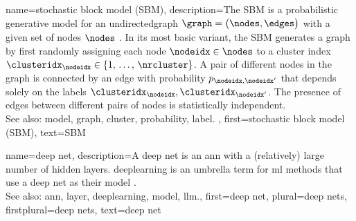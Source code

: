 {name={stochastic block model (SBM)},
	description={The SBM \cite{holland1983stochastic} is a 
		probabilistic generative \gls{model} for an \gls{undirectedgraph} $\graph = \big( \nodes, \edges \big)$ 
		with a given set of nodes $\nodes$ \cite{AbbeSBM2018}. In its most basic variant, 
		the SBM generates a \gls{graph} by first randomly assigning each node $\nodeidx \in \nodes$ to 
		a \gls{cluster} index $\clusteridx_{\nodeidx} \in \{1, \,\ldots, \,\nrcluster\}$. A pair of different nodes in the 
		\gls{graph} is \gls{connected} by an edge with \gls{probability} $p_{\nodeidx,\nodeidx'}$ that depends 
		solely on the \glspl{label} $\clusteridx_{\nodeidx}, \clusteridx_{\nodeidx'}$. 
		The presence of edges between different pairs of 
		nodes is statistically independent.
					\\ 
		See also: \gls{model}, \gls{graph}, \gls{cluster}, \gls{probability}, \gls{label}. },
	first={stochastic block model (SBM)},
	text={SBM} 
}

{name={deep net},
	description={A deep net is an \gls{ann} with a 
	    	(relatively) large number of hidden \glspl{layer}. \Gls{deeplearning} 
		is an umbrella term for \gls{ml} methods that use a deep 
		net as their \gls{model} \cite{Goodfellow-et-al-2016}.
				\\ 
		See also: \gls{ann}, \gls{layer}, \gls{deeplearning}, \gls{model}, \gls{llm}.},
	first={deep net},
	plural={deep nets},
	firstplural={deep nets},
	text={deep net} 
}

